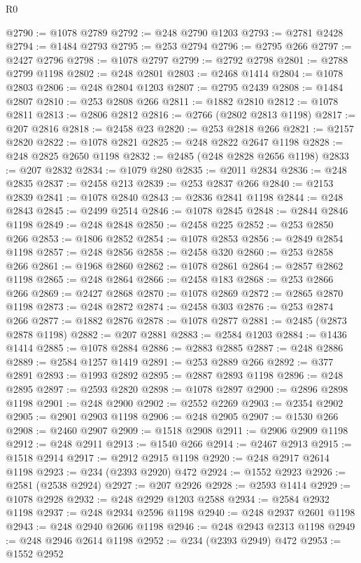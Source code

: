 \begin{lexlean}{R0}
\begin{coremodule}
@2790 := @1078 @2789
@2792 := @248 @2790 @1203
@2793 := @2781 @2428
@2794 := @1484 @2793
@2795 := @253 @2794
@2796 := @2795 @266
@2797 := @2427 @2796
@2798 := @1078 @2797
@2799 := @2792 @2798
@2801 := @2788 @2799 @1198
@2802 := @248 @2801
@2803 := @2468 @1414
@2804 := @1078 @2803
@2806 := @248 @2804 @1203
@2807 := @2795 @2439
@2808 := @1484 @2807
@2810 := @253 @2808 @266
@2811 := @1882 @2810
@2812 := @1078 @2811
@2813 := @2806 @2812
@2816 := @2766 (@2802 @2813 @1198)
@2817 := @207 @2816
@2818 := @2458 @23
@2820 := @253 @2818 @266
@2821 := @2157 @2820
@2822 := @1078 @2821
@2825 := @248 @2822 @2647 @1198
@2828 := @248 @2825 @2650 @1198
@2832 := @2485 (@248 @2828 @2656 @1198)
@2833 := @207 @2832
@2834 := @1079 @280
@2835 := @2011 @2834
@2836 := @248 @2835
@2837 := @2458 @213
@2839 := @253 @2837 @266
@2840 := @2153 @2839
@2841 := @1078 @2840
@2843 := @2836 @2841 @1198
@2844 := @248 @2843
@2845 := @2499 @2514
@2846 := @1078 @2845
@2848 := @2844 @2846 @1198
@2849 := @248 @2848
@2850 := @2458 @225
@2852 := @253 @2850 @266
@2853 := @1806 @2852
@2854 := @1078 @2853
@2856 := @2849 @2854 @1198
@2857 := @248 @2856
@2858 := @2458 @320
@2860 := @253 @2858 @266
@2861 := @1968 @2860
@2862 := @1078 @2861
@2864 := @2857 @2862 @1198
@2865 := @248 @2864
@2866 := @2458 @183
@2868 := @253 @2866 @266
@2869 := @2427 @2868
@2870 := @1078 @2869
@2872 := @2865 @2870 @1198
@2873 := @248 @2872
@2874 := @2458 @303
@2876 := @253 @2874 @266
@2877 := @1882 @2876
@2878 := @1078 @2877
@2881 := @2485 (@2873 @2878 @1198)
@2882 := @207 @2881
@2883 := @2584 @1203
@2884 := @1436 @1414
@2885 := @1078 @2884
@2886 := @2883 @2885
@2887 := @248 @2886
@2889 := @2584 @1257 @1419
@2891 := @253 @2889 @266
@2892 := @377 @2891
@2893 := @1993 @2892
@2895 := @2887 @2893 @1198
@2896 := @248 @2895
@2897 := @2593 @2820
@2898 := @1078 @2897
@2900 := @2896 @2898 @1198
@2901 := @248 @2900
@2902 := @2552 @2269
@2903 := @2354 @2902
@2905 := @2901 @2903 @1198
@2906 := @248 @2905
@2907 := @1530 @266
@2908 := @2460 @2907
@2909 := @1518 @2908
@2911 := @2906 @2909 @1198
@2912 := @248 @2911
@2913 := @1540 @266
@2914 := @2467 @2913
@2915 := @1518 @2914
@2917 := @2912 @2915 @1198
@2920 := @248 @2917 @2614 @1198
@2923 := @234 (@2393 @2920) @472
@2924 := @1552 @2923
@2926 := @2581 (@2538 @2924)
@2927 := @207 @2926
@2928 := @2593 @1414
@2929 := @1078 @2928
@2932 := @248 @2929 @1203 @2588
@2934 := @2584 @2932 @1198
@2937 := @248 @2934 @2596 @1198
@2940 := @248 @2937 @2601 @1198
@2943 := @248 @2940 @2606 @1198
@2946 := @248 @2943 @2313 @1198
@2949 := @248 @2946 @2614 @1198
@2952 := @234 (@2393 @2949) @472
@2953 := @1552 @2952

\end{coremodule}
\end{lexlean}
